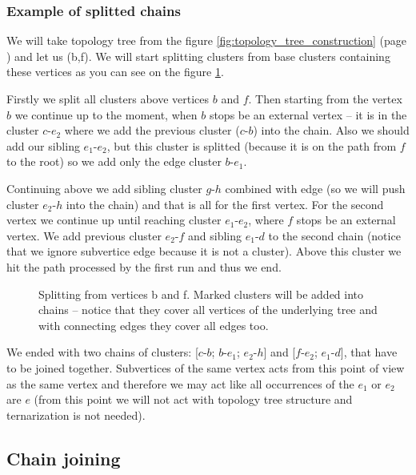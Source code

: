 \subsubsection{Example of splitted chains}

We will take topology tree from the figure \ref{fig:topology_tree_construction}
(page \pageref{fig:topology_tree_construction}) and let us \Expose(b,f). We will
start splitting clusters from base clusters containing these vertices as you
can see on the figure \ref{fig:chain_clusters_example}.

Firstly we split all clusters above vertices $b$ and $f$. Then starting from the
vertex $b$ we continue up to the moment, when $b$ stops be an external vertex
-- it is in the cluster $c$-$e_2$ where we add the previous cluster ($c$-$b$)
into the chain. Also we should add our sibling $e_1$-$e_2$, but this cluster is
splitted (because it is on the path from $f$ to the root) so we add only the
edge cluster $b$-$e_1$.

Continuing above we add sibling cluster $g$-$h$ combined with edge (so we will
push cluster $e_2$-$h$ into the chain) and that is all for the first vertex.
For the second vertex we continue up until reaching cluster $e_1$-$e_2$, where
$f$ stops be an external vertex. We add previous cluster $e_2$-$f$ and sibling
$e_1$-$d$ to the second chain (notice that we ignore subvertice edge because it
is not a cluster). Above this cluster we hit the path processed by the first run
and thus we end.

\begin{figure}[h]
\centering
{}
\caption[Splitting clusters into chains]
{Splitting from vertices b and f. Marked clusters will be added into
chains -- notice that they cover all vertices of the underlying tree and with
connecting edges they cover all edges too.}
\label{fig:chain_clusters_example}
\end{figure}

We ended with two chains of clusters: [$c$-$b$; $b$-$e_1$; $e_2$-$h$] and
[$f$-$e_2$; $e_1$-$d$], that have to be joined together. Subvertices
of the same vertex acts from this point of view as the same vertex and therefore
we may act like all occurrences of the $e_1$ or $e_2$ are $e$ (from this point
we will not act with topology tree structure and ternarization is not needed).

\subsection{Chain joining}

